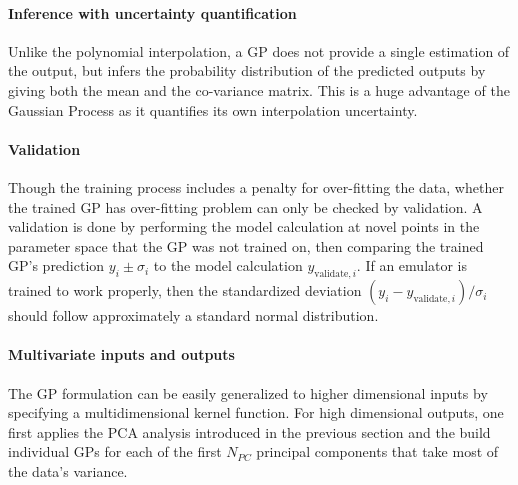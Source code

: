 \paragraph{Inference with uncertainty quantification} Unlike the polynomial interpolation, a GP does not provide a single estimation of the output, but infers the probability distribution of the predicted outputs by giving both the mean and the co-variance matrix.
This is a huge advantage of the Gaussian Process as it quantifies its own interpolation uncertainty.

\paragraph{Validation} Though the training process includes a penalty for over-fitting the data, whether the trained GP has over-fitting problem can only be checked by validation.
A validation is done by performing the model calculation at novel points in the parameter space that the GP was not trained on, then comparing the trained GP's prediction $y_i \pm \sigma_i$ to the model calculation $y_{\textrm{validate}, i}$.
If an emulator is trained to work properly, then the standardized deviation $(y_i - y_{\textrm{validate}, i})/\sigma_i$ should follow approximately a standard normal distribution.

\paragraph{Multivariate inputs and outputs} The GP formulation can be easily generalized to higher dimensional inputs by specifying a multidimensional kernel function.
For high dimensional outputs, one first applies the PCA analysis introduced in the previous section and the build individual GPs for each of the first $N_{PC}$ principal components that take most of the data's variance.

